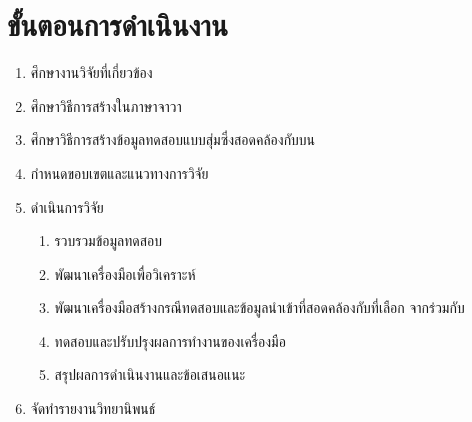 \section{ขั้นตอนการดำเนินงาน}

\begin{enumerate}
    \item ศึกษางานวิจัยที่เกี่ยวข้อง
    \item ศึกษาวิธีการสร้าง{\scg}ในภาษาจาวา
    \item ศึกษาวิธีการสร้างข้อมูลทดสอบแบบสุ่มซึ่งสอดคล้องกับ{\PredicateNode}บน{\TestPath}
    \item กำหนดขอบเขตและแนวทางการวิจัย
    \item ดำเนินการวิจัย
    \begin{enumerate}
        \item รวบรวมข้อมูลทดสอบ
        \item พัฒนาเครื่องมือเพื่อวิเคราะห์{\scg}
        \item พัฒนาเครื่องมือสร้างกรณีทดสอบและข้อมูลนำเข้าที่สอดคล้องกับ{\TestPath}ที่เลือก จาก{\scg}ร่วมกับ{\cfg}
        \item ทดสอบและปรับปรุงผลการทำงานของเครื่องมือ
        \item สรุปผลการดำเนินงานและข้อเสนอแนะ
    \end{enumerate}
    \item จัดทำรายงานวิทยานิพนธ์
\end{enumerate}

